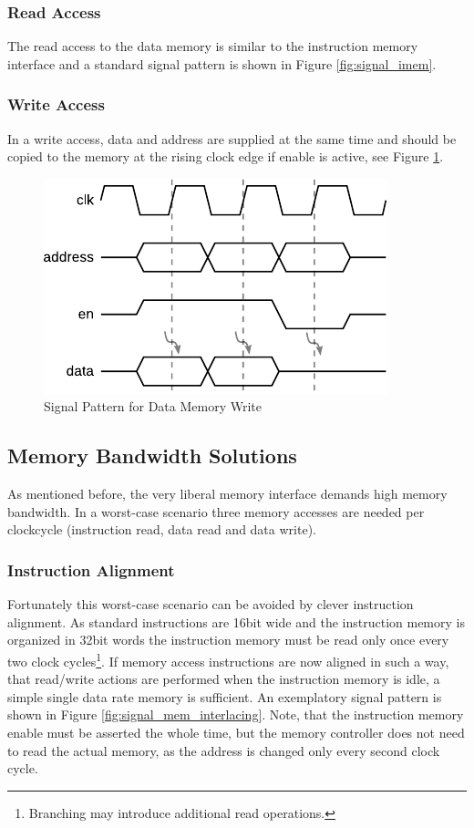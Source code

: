 \subsubsection{Read Access}
The read access to the data memory is similar to the instruction memory interface and a standard signal pattern is shown in Figure \ref{fig:signal_imem}.

\subsubsection{Write Access}
In a write access, data and address are supplied at the same time and should be copied to the memory at the rising clock edge if enable is active, see Figure \ref{fig:signal_dmem_write}.
\begin{figure}[htb]
	\centering
	\includegraphics[scale=1]{./figures/signal_dmem_write.pdf}
	\caption{Signal Pattern for Data Memory Write}
	\label{fig:signal_dmem_write}
\end{figure}
\subsection{Memory Bandwidth Solutions}
As mentioned before, the very liberal memory interface demands high memory bandwidth.
In a worst-case scenario three memory accesses are needed per clockcycle (instruction read, data read and data write).

\subsubsection{Instruction Alignment}
Fortunately this worst-case scenario can be avoided by clever instruction alignment.
As standard instructions are 16bit wide and the instruction memory is organized
in 32bit words the instruction memory must be read only once every two clock cycles\footnote{Branching may introduce additional read operations.}.
If memory access instructions are now aligned in such a way, that read/write actions are performed when the instruction memory is idle, a simple single data rate memory is sufficient.
An exemplatory signal pattern is shown in Figure \ref{fig:signal_mem_interlacing}.
Note, that the instruction memory enable must be asserted the whole time,
but the memory controller does not need to read the actual memory,
as the address is changed only every second clock cycle.


